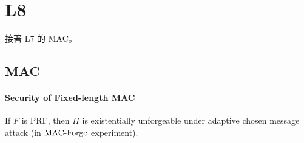 \section{L8}

接著 L7 的 MAC。


\subsection{MAC}


\paragraph{Security of Fixed-length MAC}

\begin{theorem}
	If \(F\) is PRF, then \(\Pi\) is existentially unforgeable under adaptive chosen message attack (in \(\operatorname{\mathrm{MAC-Forge}}\) experiment).
\end{theorem}

